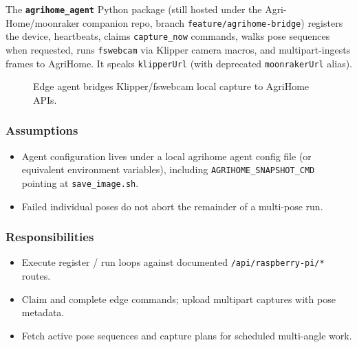 The \textbf{\texttt{agrihome\_agent}} Python package (still hosted under the Agri-Home/moonraker companion repo, branch \texttt{feature/agrihome-bridge}) registers the device, heartbeats, claims \texttt{capture\_now} commands, walks pose sequences when requested, runs \texttt{fswebcam} via Klipper camera macros, and multipart-ingests frames to AgriHome. It speaks \texttt{klipperUrl} (with deprecated \texttt{moonrakerUrl} alias).

\begin{figure}[H]
\centering
{}
\caption{Edge agent bridges Klipper/fswebcam local capture to AgriHome APIs.}
\label{fig:hw-agent}
\end{figure}

\subsubsection{Assumptions}
\begin{itemize}
  \item Agent configuration lives under a local agrihome agent config file (or equivalent environment variables), including \texttt{AGRIHOME\_SNAPSHOT\_CMD} pointing at \texttt{save\_image.sh}.
  \item Failed individual poses do not abort the remainder of a multi-pose run.
\end{itemize}

\subsubsection{Responsibilities}
\begin{itemize}
  \item Execute register / run loops against documented \texttt{/api/raspberry-pi/*} routes.
  \item Claim and complete edge commands; upload multipart captures with pose metadata.
  \item Fetch active pose sequences and capture plans for scheduled multi-angle work.
\end{itemize}

